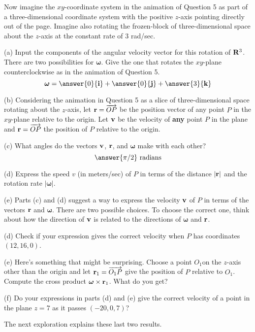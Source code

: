 \documentclass{ximera}
\begin{document}
\begin{question}  \label{Qhfnbyt:Cross}
Now imagine the $xy$-coordinate system in the animation of Question 5  as part of a three-dimensional coordinate system with the positive $z$-axis pointing directly out of the page. Imagine also rotating the frozen-block of three-dimensional space about the $z$-axis at the constant rate of $3$ rad/sec. 


(a) Input the components of the angular velocity vector for this rotation of ${\bf R}^3$. There are two possibilities for $\boldsymbol{\omega}$. Give the one that rotates the $xy$-plane counterclockwise as in the animation of Question 5. 
\[
\boldsymbol{\omega} = \answer{0}{\bf i} + \answer{0}{\bf j} + \answer{3}{\bf k}
\]

(b) Considering the animation in Question 5 as a slice of three-dimensional space rotating about the $z$-axis, let ${\bf r} = \overrightarrow{OP}$ be the position vector of any point $P$ in the $xy$-plane relative to the origin. Let ${\bf v}$ be the velocity of {\bf any} point $P$ in the plane and ${\bf r} = \overrightarrow{OP}$ the position of $P$ relative to the origin.

(c) What angles do the vectors ${\bf v}$,  ${\bf r}$, and $\boldsymbol{\omega}$ make with each other?
\[
     \answer{\pi/2}\text{ radians}
\]

(d) Express the speed $v$ (in meters/sec) of $P$ in terms of the distance $|{\bf r}|$ and the rotation rate $|\boldsymbol{\omega}|$.

(e) Parts (c) and (d) suggest a way to express the velocity ${\bf v}$ of $P$ in terms of the vectors ${\bf r}$ and $\boldsymbol{\omega}$.
There are two possible choices. To choose the correct one, think about how the direction of ${\bf v}$ is related to the directions of $\boldsymbol{\omega}$ and ${\bf r}$. 

\begin{multipleChoice}  
\end{multipleChoice}  


(d) Check if your expression gives the correct velocity when $P$ has coordinates $(12, 16,0)$.

(e) Here's something that might be surprising. Choose a point $O_1$on the $z$-axis other than the origin and let ${\bf r}_1 = \overrightarrow{O_1P}$ give the position of $P$ relative to $O_1$. Compute the cross product $\boldsymbol{\omega} \times {\bf r}_1$. What do you get?

(f) Do your expressions in parts (d) and (e) give the correct velocity of a point in the plane $z=7$ as it passes $(-20,0,7)$?

The next exploration explains these last two results.

\end{question}
\end{document}
